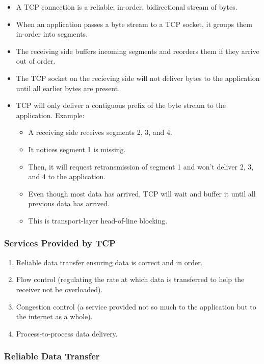\documentclass{article}
\begin{document}
\begin{itemize}
    \item A TCP connection is a reliable, in-order, bidirectional stream of bytes.
    \item When an application passes a byte stream to a TCP socket, it groups them in-order into segments.
    \item The receiving side buffers incoming segments and reorders them if they arrive out of order.
    \item The TCP socket on the recieving side will not deliver bytes to the application until all earlier bytes are present.
    \item TCP will only deliver a contiguous prefix of the byte stream to the application. Example:
    \begin{itemize}
        \item A receiving side receives segments 2, 3, and 4.
        \item It notices segment 1 is missing.
        \item Then, it will request retransmission of segment 1 and won't deliver 2, 3, and 4 to the application.
        \item Even though most data has arrived, TCP will wait and buffer it until all previous data has arrived.
        \item This is transport-layer head-of-line blocking.
    \end{itemize}
\end{itemize}

\subsubsection{Services Provided by TCP}

\begin{enumerate}
    \item Reliable data transfer ensuring data is correct and in order.
    \item Flow control (regulating the rate at which data is transferred to help the receiver not be overloaded).
    \item Congestion control (a service provided not so much to the application but to the internet as a whole).
    \item Process-to-process data delivery.
\end{enumerate}

\subsubsection{Reliable Data Transfer}
\end{document}

